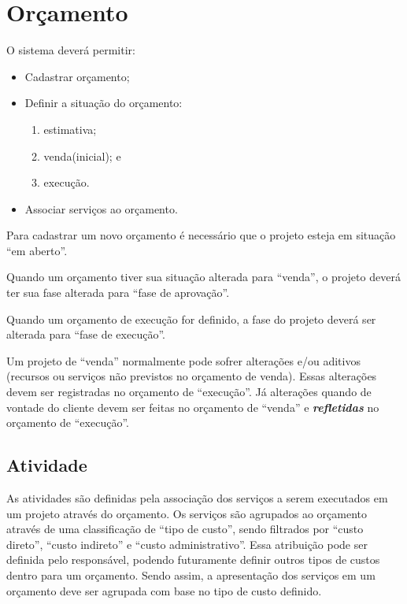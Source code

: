 \chapter{Orçamento}

O sistema deverá permitir:

\begin{itemize}
	\item Cadastrar orçamento;
	\item Definir a situação do orçamento:
	\begin{enumerate}
		\item estimativa;
		\item venda(inicial); e
		\item execução.
	\end{enumerate}
	\item Associar serviços ao orçamento.
\end{itemize}

Para cadastrar um novo orçamento é necessário que o projeto esteja em situação ``em aberto''.

Quando um orçamento tiver sua situação alterada para ``venda'', o projeto deverá ter sua fase alterada para ``fase de aprovação''.

Quando um orçamento de execução for definido, a fase do projeto deverá ser alterada para ``fase de execução''.

Um projeto de ``venda'' normalmente pode sofrer alterações e/ou aditivos (recursos ou serviços não previstos no orçamento de venda). Essas alterações devem ser registradas no orçamento de ``execução''. Já alterações quando de vontade do cliente devem ser feitas no orçamento de ``venda'' e \emph{\textbf{refletidas}} no orçamento de ``execução''.

\section{Atividade}

As atividades são definidas pela associação dos serviços a serem executados em um projeto através do orçamento. Os serviços são agrupados ao orçamento através de uma classificação de ``tipo de custo'', sendo filtrados por ``custo direto'', ``custo indireto'' e ``custo administrativo''. Essa atribuição pode ser definida pelo responsável, podendo futuramente definir outros tipos de custos dentro para um orçamento. Sendo assim, a apresentação dos serviços em um orçamento deve ser agrupada com base no tipo de custo definido. 

